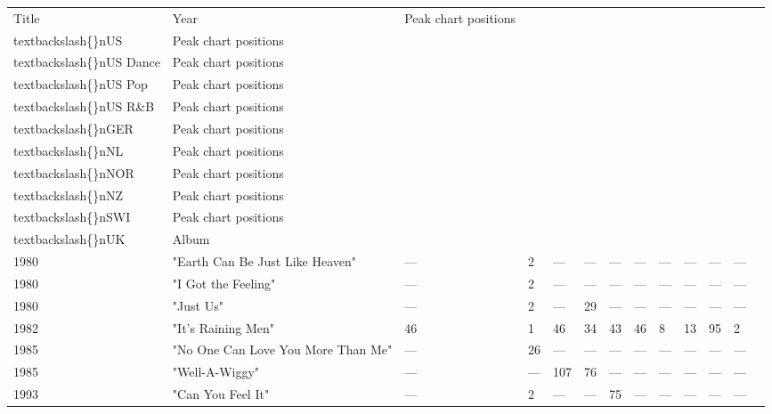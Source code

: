 \documentclass{article}
\begin{document}
\begin{tabular}{lllllllllllll}
\toprule
Title & Year & Peak chart positions\\textbackslash\{\}nUS & Peak chart positions\\textbackslash\{\}nUS Dance & Peak chart positions\\textbackslash\{\}nUS Pop & Peak chart positions\\textbackslash\{\}nUS R\&B & Peak chart positions\\textbackslash\{\}nGER & Peak chart positions\\textbackslash\{\}nNL & Peak chart positions\\textbackslash\{\}nNOR & Peak chart positions\\textbackslash\{\}nNZ & Peak chart positions\\textbackslash\{\}nSWI & Peak chart positions\\textbackslash\{\}nUK & Album \\
\midrule
1980 & "Earth Can Be Just Like Heaven" & — & 2 & — & — & — & — & — & — & — & — &  \\
1980 & "I Got the Feeling" & — & 2 & — & — & — & — & — & — & — & — &  \\
1980 & "Just Us" & — & 2 & — & 29 & — & — & — & — & — & — &  \\
1982 & "It's Raining Men" & 46 & 1 & 46 & 34 & 43 & 46 & 8 & 13 & 95 & 2 &  \\
1985 & "No One Can Love You More Than Me" & — & 26 & — & — & — & — & — & — & — & — &  \\
1985 & "Well-A-Wiggy" & — & — & 107 & 76 & — & — & — & — & — & — &  \\
1993 & "Can You Feel It" & — & 2 & — & — & 75 & — & — & — & — & — &  \\
\bottomrule
\end{tabular}
\end{document}
